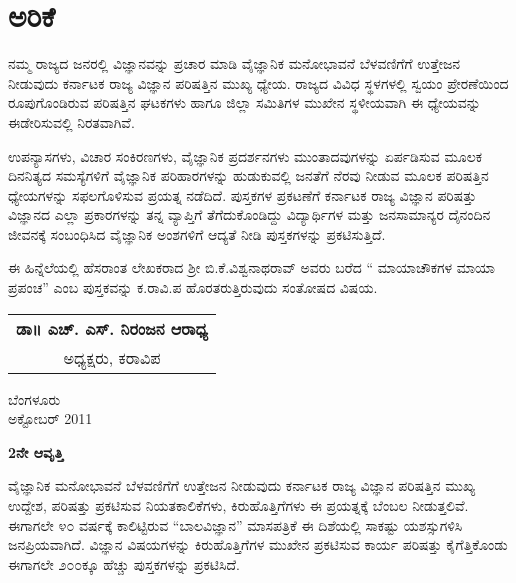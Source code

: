 \chapter*{ಅರಿಕೆ}

\phantom{a}

\vskip  -1.2cm

ನಮ್ಮ ರಾಜ್ಯದ ಜನರಲ್ಲಿ ವಿಜ್ಞಾನವನ್ನು ಪ್ರಚಾರ ಮಾಡಿ ವೈಜ್ಞಾನಿಕ ಮನೋಭಾವನೆ \linebreak ಬೆಳವಣಿಗೆಗೆ ಉತ್ತೇಜನ ನೀಡುವುದು ಕರ್ನಾಟಕ ರಾಜ್ಯ ವಿಜ್ಞಾನ ಪರಿಷತ್ತಿನ ಮುಖ್ಯ ಧ್ಯೇಯ. ರಾಜ್ಯದ ವಿವಿಧ ಸ್ಥಳಗಳಲ್ಲಿ ಸ್ವಯಂ ಪ್ರೇರಣೆಯಿಂದ ರೂಪುಗೊಂಡಿರುವ ಪರಿಷತ್ತಿನ ಘಟಕ\-ಗಳು ಹಾಗೂ ಜಿಲ್ಲಾ ಸಮಿತಿಗಳ ಮುಖೇನ ಸ್ಥಳೀಯವಾಗಿ ಈ ಧ್ಯೇಯವನ್ನು ಈಡೇರಿಸುವಲ್ಲಿ ನಿರತವಾಗಿವೆ.

ಉಪನ್ಯಾಸಗಳು, ವಿಚಾರ ಸಂಕಿರಣಗಳು, ವೈಜ್ಞಾನಿಕ ಪ್ರದರ್ಶನಗಳು ಮುಂತಾದವು\-ಗಳನ್ನು ಏರ್ಪಡಿಸುವ ಮೂಲಕ ದಿನನಿತ್ಯದ ಸಮಸ್ಯೆಗಳಿಗೆ ವೈಜ್ಞಾನಿಕ ಪರಿಹಾರಗಳನ್ನು ಹುಡುಕು\-ವಲ್ಲಿ ಜನತೆಗೆ ನೆರವು ನೀಡುವ ಮೂಲಕ ಪರಿಷತ್ತಿನ  ಧ್ಯೇಯಗಳನ್ನು ಸಫಲಗೊಳಿಸುವ ಪ್ರಯತ್ನ ನಡೆದಿದೆ. ಪುಸ್ತಕಗಳ ಪ್ರಕಟಣೆಗೆ ಕರ್ನಾಟಕ ರಾಜ್ಯ ವಿಜ್ಞಾನ ಪರಿಷತ್ತು ವಿಜ್ಞಾನದ ಎಲ್ಲಾ ಪ್ರಕಾರ\-ಗಳನ್ನು ತನ್ನ ವ್ಯಾಪ್ತಿಗೆ ತೆಗೆದುಕೊಂಡಿದ್ದು ವಿದ್ಯಾರ್ಥಿಗಳ ಮತ್ತು ಜನ\-ಸಾಮಾನ್ಯರ ದೈನಂದಿನ ಜೀವನಕ್ಕೆ ಸಂಬಂಧಿಸಿದ ವೈಜ್ಞಾನಿಕ ಅಂಶಗಳಿಗೆ ಆದ್ಯತೆ ನೀಡಿ ಪುಸ್ತಕಗಳನ್ನು \linebreak ಪ್ರಕಟಿಸುತ್ತಿದೆ.

ಈ ಹಿನ್ನೆಲೆಯಲ್ಲಿ ಹೆಸರಾಂತ ಲೇಖಕರಾದ ಶ್ರೀ ಬಿ.ಕೆ.ವಿಶ್ವನಾಥರಾವ್​ ಅವರು ಬರೆದ “ ಮಾಯಾಚೌಕಗಳ ಮಾಯಾ ಪ್ರಪಂಚ” ಎಂಬ ಪುಸ್ತಕವನ್ನು ಕ.ರಾವಿ.ಪ ಹೊರತರುತ್ತಿರುವುದು ಸಂತೋಷದ ವಿಷಯ.

\medskip
\medskip

\begin{flushright}
\begin{tabular}{c}
{\bf ಡಾ॥ ಎಚ್. ಎಸ್. ನಿರಂಜನ ಆರಾಧ್ಯ} \\
ಅಧ್ಯಕ್ಷರು, ಕರಾವಿಪ
\end{tabular}
\end{flushright}

\noindent
ಬೆಂಗಳೂರು\\
ಅಕ್ಟೋಬರ್ {\rm  2011}\relax
\vfill
\eject

\begin{center}
{\bf 2ನೇ ಆವೃತ್ತಿ}
\end{center}

\noindent ವೈಜ್ಞಾನಿಕ ಮನೋಭಾವನೆ ಬೆಳವಣಿಗೆಗೆ ಉತ್ತೇಜನ ನೀಡುವುದು ಕರ್ನಾಟಕ ರಾಜ್ಯ ವಿಜ್ಞಾನ ಪರಿಷತ್ತಿನ ಮುಖ್ಯ ಉದ್ದೇಶ, ಪರಿಷತ್ತು ಪ್ರಕಟಿಸುವ ನಿಯತಕಾಲಿಕೆಗಳು, ಕಿರುಹೊತ್ತಿಗೆಗಳು ಈ ಪ್ರಯತ್ನಕ್ಕೆ ಬೆಂಬಲ ನೀಡುತ್ತಲಿವೆ. ಈಗಾಗಲೇ ೪೦ ವರ್ಷಕ್ಕೆ ಕಾಲಿಟ್ಟಿರುವ “ಬಾಲವಿಜ್ಞಾನ” ಮಾಸಪತ್ರಿಕೆ ಈ ದಿಶೆಯಲ್ಲಿ ಸಾಕಷ್ಟು ಯಶಸ್ಸುಗಳಿಸಿ ಜನಪ್ರಿಯವಾಗಿದೆ. ವಿಜ್ಞಾನ ವಿಷಯ\-ಗಳನ್ನು ಕಿರುಹೊತ್ತಿಗೆಗಳ ಮುಖೇನ ಪ್ರಕಟಿಸುವ ಕಾರ್ಯ ಪರಿಷತ್ತು ಕೈಗೆತ್ತಿಕೊಂಡು ಈಗಾಗಲೇ ೨೦೦ಕ್ಕೂ ಹೆಚ್ಚು ಪುಸ್ತಕಗಳನ್ನು  ಪ್ರಕಟಿಸಿದೆ. 

